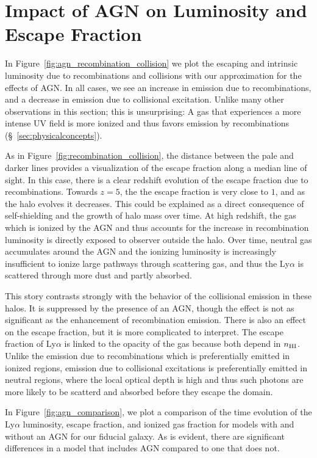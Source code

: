 \section{Impact of AGN on Luminosity and Escape Fraction}
In Figure~\ref{fig:agn_recombination_collision} we plot the escaping and intrinsic luminosity due to recombinations and collisions with our approximation for the effects of AGN.
In all cases, we see an increase in emission due to recombinations, and a decrease in emission due to collisional excitation.
Unlike many other observations in this section; this is unsurprising: A gas that experiences a more intense UV field is more ionized and thus favors emission by recombinations (\S~\ref{sec:physicalconcepts}).

As in Figure~\ref{fig:recombination_collision}, the distance between the pale and darker lines provides a visualization of the escape fraction along a median line of sight.
In this case, there is a clear redshift evolution of the escape fraction due to recombinations.
Towards $z=5$, the the escape fraction is very close to $1$, and as the halo evolves it decreases.
This could be explained as a direct consequence of self-shielding and the growth of halo mass over time.
At high redshift, the gas which is ionized by the AGN and thus accounts for the increase in recombination luminosity is directly exposed to observer outside the halo.
Over time, neutral gas accumulates around the AGN and the ionizing luminosity is increasingly insufficient to ionize large pathways through scattering gas, and thus the Ly$\alpha$ is scattered through more dust and partly absorbed.

This story contrasts strongly with the behavior of the collisional emission in these halos.
It is suppressed by the presence of an AGN, though the effect is not as significant as the enhancement of recombination emission.
There is also an effect on the escape fraction, but it is more complicated to interpret.
The escape fraction of Ly$\alpha$ is linked to the opacity of the gas because both depend in $n_{\rm{HI}}$.
Unlike the emission due to recombinations which is preferentially emitted in ionized regions, emission due to collisional excitations is preferentially emitted in neutral regions, where the local optical depth is high and thus such photons are more likely to be scatterd and absorbed before they escape the domain.


In Figure~\ref{fig:agn_comparison}, we plot a comparison of the time evolution of the Ly$\alpha$ luminosity, escape fraction, and ionized gas fraction for models with and without an AGN for our fiducial galaxy.
As is evident, there are significant differences in a model that includes AGN compared to one that does not.


